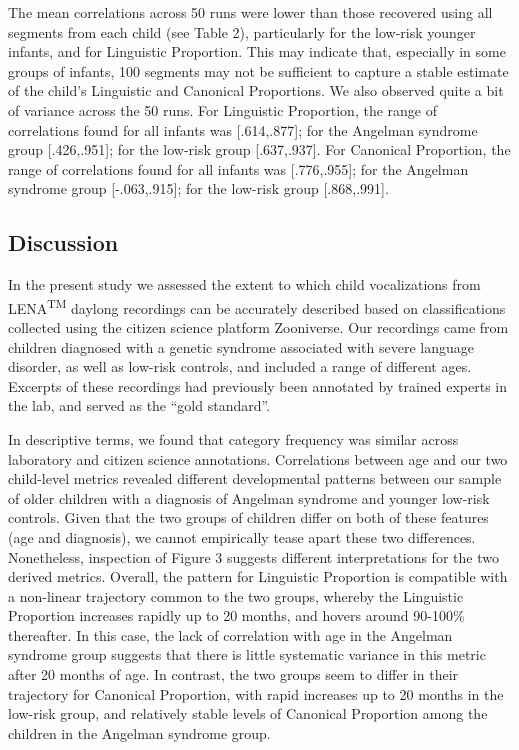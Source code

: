 \documentclass[english,,man]{apa6}
\begin{document}
The mean correlations across 50 runs were lower than those recovered using all segments from each child (see Table 2), particularly for the low-risk younger infants, and for Linguistic Proportion. This may indicate that, especially in some groups of infants, 100 segments may not be sufficient to capture a stable estimate of the child's Linguistic and Canonical Proportions. We also observed quite a bit of variance across the 50 runs. For Linguistic Proportion, the range of correlations found for all infants was {[}.614,.877{]}; for the Angelman syndrome group {[}.426,.951{]}; for the low-risk group {[}.637,.937{]}. For Canonical Proportion, the range of correlations found for all infants was {[}.776,.955{]}; for the Angelman syndrome group {[}-.063,.915{]}; for the low-risk group {[}.868,.991{]}.

\hypertarget{discussion}{%
\subsection{Discussion}\label{discussion}}

In the present study we assessed the extent to which child vocalizations from LENA\textsuperscript{TM} daylong recordings can be accurately described based on classifications collected using the citizen science platform Zooniverse. Our recordings came from children diagnosed with a genetic syndrome associated with severe language disorder, as well as low-risk controls, and included a range of different ages. Excerpts of these recordings had previously been annotated by trained experts in the lab, and served as the \enquote{gold standard}.

In descriptive terms, we found that category frequency was similar across laboratory and citizen science annotations. Correlations between age and our two child-level metrics revealed different developmental patterns between our sample of older children with a diagnosis of Angelman syndrome and younger low-risk controls. Given that the two groups of children differ on both of these features (age and diagnosis), we cannot empirically tease apart these two differences. Nonetheless, inspection of Figure 3 suggests different interpretations for the two derived metrics. Overall, the pattern for Linguistic Proportion is compatible with a non-linear trajectory common to the two groups, whereby the Linguistic Proportion increases rapidly up to 20 months, and hovers around 90-100\% thereafter. In this case, the lack of correlation with age in the Angelman syndrome group suggests that there is little systematic variance in this metric after 20 months of age. In contrast, the two groups seem to differ in their trajectory for Canonical Proportion, with rapid increases up to 20 months in the low-risk group, and relatively stable levels of Canonical Proportion among the children in the Angelman syndrome group.
\end{document}
